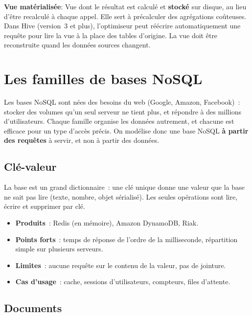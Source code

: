 \separateur

\noindent \textbf{Vue matérialisée}:
\noindent Vue dont le résultat est calculé et \textbf{stocké} sur disque, au lieu d'être recalculé à chaque appel. Elle sert à précalculer des agrégations coûteuses. Dans Hive (version~3 et plus), l'optimiseur peut réécrire automatiquement une requête pour lire la vue à la place des tables d'origine. La vue doit être reconstruite quand les données sources changent.

\newpage
\section{Les familles de bases NoSQL}\label{sec:familles}

\noindent Les bases NoSQL sont nées des besoins du web (Google, Amazon, Facebook)~: stocker des volumes qu'un seul serveur ne tient plus, et répondre à des millions d'utilisateurs. Chaque famille organise les données autrement, et chacune est efficace pour un type d'accès précis. On modélise donc une base NoSQL \textbf{à partir des requêtes} à servir, et non à partir des données.

\subsection{Clé-valeur}

\noindent La base est un grand dictionnaire~: une clé unique donne une valeur que la base ne sait pas lire (texte, nombre, objet sérialisé). Les seules opérations sont lire, écrire et supprimer par clé.
\begin{itemize}
	\item \textbf{Produits}~: Redis (en mémoire), Amazon DynamoDB, Riak.
	\item \textbf{Points forts}~: temps de réponse de l'ordre de la milliseconde, répartition simple sur plusieurs serveurs.
	\item \textbf{Limites}~: aucune requête sur le contenu de la valeur, pas de jointure.
	\item \textbf{Cas d'usage}~: cache, sessions d'utilisateurs, compteurs, files d'attente.
\end{itemize}

\subsection{Documents}

